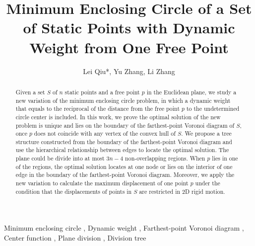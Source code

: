 \documentclass[final,3p,times]{elsarticle}
\begin{document}
\begin{frontmatter}



\title{Minimum Enclosing Circle of a Set of Static Points with Dynamic Weight from One Free Point  }

\author{Lei Qiu*, Yu Zhang, Li Zhang}
\address{Department of Electronic Engineering, Tsinghua University, Beijing, China}
\begin{abstract}
Given a set $S$ of $n$ static points and a free point $p$ in the Euclidean plane, we study a new variation of the minimum enclosing circle problem, in which a dynamic weight that equals to the reciprocal of the distance from the free point $p$ to the undetermined circle center is included. In this work, we prove the optimal solution of the new problem is unique and lies on the boundary of the farthest-point Voronoi diagram of $S$, once $p$ does not coincide with any vertex of the convex hull of $S$. We propose a tree structure constructed from the boundary of the farthest-point Voronoi diagram and use the hierarchical relationship between edges to locate the optimal solution. The plane could be divide into at most $3n-4$ non-overlapping regions. When $p$ lies in one of the regions, the optimal solution locates at one node or lies on the interior of one edge in the boundary of the farthest-point Voronoi diagram. Moreover, we apply the new variation to calculate the maximum displacement of one point $p$ under the condition that the displacements of points in $S$ are restricted in 2D rigid motion.
\end{abstract}

\begin{keyword}
Minimum enclosing circle \sep
Dynamic weight \sep
Farthest-point Voronoi diagram \sep
Center function \sep
Plane division \sep
Division tree


\end{keyword}
\end{frontmatter}
\end{document}
